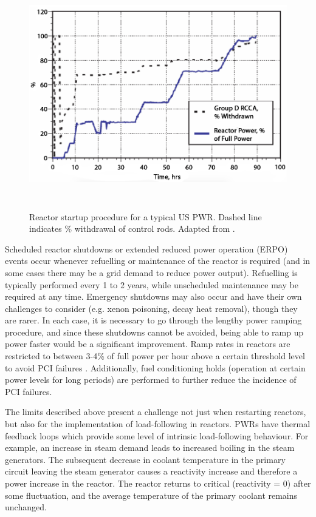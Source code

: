 \begin{figure}[ht]
\centering
\includegraphics[height=10cm]{images/reactor_startup.png}
\caption[Reactor startup procedure for a typical US PWR. Dashed line indicates \% withdrawal of control rods.]{Reactor startup procedure for a typical US PWR. Dashed line indicates \% withdrawal of control rods. Adapted from \cite{ramping}.}
\label{figure:reactor_startup}
\end{figure}

Scheduled reactor shutdowns or extended reduced power operation (ERPO) events occur whenever refuelling or maintenance of the reactor is required (and in some cases there may be a grid demand to reduce power output).  Refuelling is typically performed every 1 to 2 years, while unscheduled maintenance may be required at any time. Emergency shutdowns may also occur and have their own challenges to consider (e.g. xenon poisoning, decay heat removal), though they are rarer. In each case, it is necessary to go through the lengthy power ramping procedure, and since these shutdowns cannot be avoided, being able to ramp up power faster would be a significant improvement. Ramp rates in reactors are restricted to between 3-4\% of full power per hour above a certain threshold level to avoid PCI failures \cite{ramping}. Additionally, fuel conditioning holds (operation at certain power levels for long periods) are performed to further reduce the incidence of PCI failures. 

The limits described above present a challenge not just when restarting reactors, but also for the implementation of load-following in reactors. PWRs have thermal feedback loops which provide some level of intrinsic load-following behaviour. For example, an increase in steam demand leads to increased boiling in the steam generators. The subsequent decrease in coolant temperature in the primary circuit leaving the steam generator causes a reactivity increase and therefore a power increase in the reactor. The reactor returns to critical (reactivity = 0) after some fluctuation, and the average temperature of the primary coolant remains unchanged.

